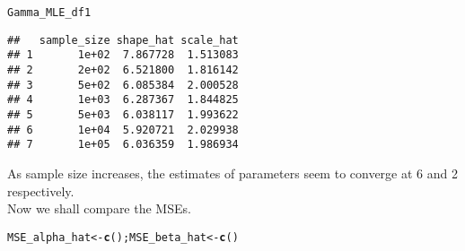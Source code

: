 \documentclass[11pt, a4paper]{article}\usepackage[]{graphicx}\usepackage[]{xcolor}
\makeatletter
\newcommand{\hldef}[1]{\textcolor[rgb]{0.345,0.345,0.345}{#1}}%
\newcommand{\hlkwb}[1]{\textcolor[rgb]{0.69,0.353,0.396}{#1}}%
\newcommand{\hlkwd}[1]{\textcolor[rgb]{0.737,0.353,0.396}{\textbf{#1}}}%
\newenvironment{kframe}{%
 \def\at@end@of@kframe{}%
 \ifinner\ifhmode%
  \def\at@end@of@kframe{\end{minipage}}%
  \begin{minipage}{\columnwidth}%
 \fi\fi%
 \def\FrameCommand##1{\hskip\@totalleftmargin \hskip-\fboxsep
 \colorbox{shadecolor}{##1}\hskip-\fboxsep
     \hskip-\linewidth \hskip-\@totalleftmargin \hskip\columnwidth}%
 \MakeFramed {\advance\hsize-\width
   \@totalleftmargin\z@ \linewidth\hsize
   \@setminipage}}%
 {\par\unskip\endMakeFramed%
 \at@end@of@kframe}
\newenvironment{knitrout}{}{} %
\makeatother
\begin{document}
\begin{knitrout}
\color{fgcolor}\begin{kframe}
\begin{alltt}
\hldef{Gamma_MLE_df1}
\end{alltt}
\begin{verbatim}
##   sample_size shape_hat scale_hat
## 1       1e+02  7.867728  1.513083
## 2       2e+02  6.521800  1.816142
## 3       5e+02  6.085384  2.000528
## 4       1e+03  6.287367  1.844825
## 5       5e+03  6.038117  1.993622
## 6       1e+04  5.920721  2.029938
## 7       1e+05  6.036359  1.986934
\end{verbatim}
\end{kframe}
\end{knitrout}

\smallpencil \hspace{0.1cm} {\setlength{\spaceskip}{1em plus 0.5em minus 0.5em} \fontsize{17}{20}\myfont As sample size increases, the estimates of parameters seem to converge at 6 and 2 respectively. \\

Now we shall compare the MSEs.
\par}




\begin{knitrout}
\color{fgcolor}\begin{kframe}
\begin{alltt}
\hldef{MSE_alpha_hat} \hlkwb{<-} \hlkwd{c}\hldef{(); MSE_beta_hat} \hlkwb{<-} \hlkwd{c}\hldef{()}
\end{alltt}
\end{kframe}
\end{knitrout}
\end{document}

